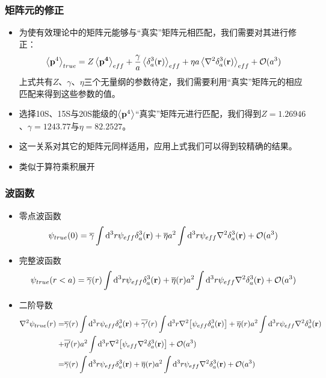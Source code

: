 \documentclass[8pt]{beamer}
\begin{document}
\begin{frame}
\frametitle{矩阵元的修正}
\begin{itemize}
\item 为使有效理论中的矩阵元能够与“真实”矩阵元相匹配，我们需要对其进行修正：
\begin{equation}\label{p4true}
	\expval{\vb{p}^4}_{true}=Z\expval{\vb{p^4}}_{eff}+\frac{\gamma}{a}\expval{\delta^3_a(\vb{r})}_{eff}+\eta a\expval{\laplacian{\delta^3_a(\vb{r})}}_{eff}+\mathcal{O}(a^3)
\end{equation}
上式共有$Z$、$\gamma$、$\eta$三个无量纲的参数待定，我们需要利用“真实”矩阵元的相应匹配来得到这些参数的值。

\vspace{12pt}
\item 选择10S、15S与20S能级的$\expval{\vb{p}^4}$“真实”矩阵元进行匹配，我们得到$Z=1.26946$、$\gamma=1243.77$与$\eta=82.2527$。

\vspace{12pt}
\item 这一关系对其它的矩阵元同样适用，应用上式我们可以得到较精确的结果。
\vspace{12pt}
\item 类似于算符乘积展开
\end{itemize}
\end{frame}

\begin{frame}
\frametitle{波函数}
\begin{itemize}
  \item 零点波函数
  \begin{equation}\label{psi0}
	\psi_{true}(0)=\overline{\gamma}\int\dd^3r\psi_{eff}\delta^3_a(\vb{r})+\overline{\eta}a^2\int\dd^3r\psi_{eff}\laplacian{\delta^3_a(\vb{r})}+\mathcal{O}(a^3)
\end{equation}
  \item 完整波函数
  \begin{equation}\label{psi0r}
	\psi_{true}(r<a)=\overline{\gamma}(r)\int\dd^3r\psi_{eff}\delta^3_a(\vb{r})+\overline{\eta}(r)a^2\int\dd^3r\psi_{eff}\laplacian{\delta^3_a(\vb{r})}+\mathcal{O}(a^3)
\end{equation}
\item 二阶导数
\begin{alignat}{1}\label{psi0rl}
	\laplacian{\psi_{true}(r)}= & \overline{\gamma}(r)\int\dd^3r\psi_{eff}\delta^3_a(\vb{r})+\overline{\gamma'}(r)\int\dd^3r\laplacian{\bqty{\psi_{eff}\delta^3_a(\vb{r})}}+\overline{\eta}(r)a^2\int\dd^3r\psi_{eff}\laplacian{\delta^3_a(\vb{r})}
	\nonumber\\\nonumber+&\overline{\eta'}(r)a^2\int\dd^3r\laplacian{\bqty{\psi_{eff}\laplacian{\delta^3_a(\vb{r})}}}+\mathcal{O}(a^3)\\
=&\overline{\gamma}(r)\int\dd^3r\psi_{eff}\delta^3_a(\vb{r})+\overline{\eta}(r)a^2\int\dd^3r\psi_{eff}\laplacian{\delta^3_a(\vb{r})}+\mathcal{O}(a^3)
\end{alignat}
\end{itemize}
\end{frame}
\end{document}
